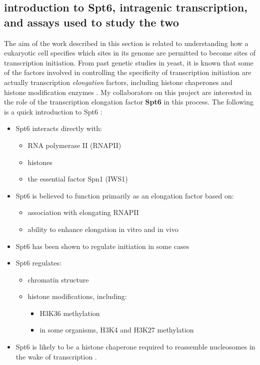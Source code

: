 \documentclass[9pt, letterpaper]{article}
\begin{document}
\subsection{introduction to Spt6, intragenic transcription, and assays used to study the two}

The aim of the work described in this section is related to understanding how a eukaryotic cell specifies which sites in its genome are permitted to become sites of transcription initiation. From past genetic studies in yeast, it is known that some of the factors involved in controlling the specificity of transcription initiation are actually transcription \textit{elongation} factors, including histone chaperones and histone modification enzymes \cite{kaplan2003, cheung2008, hennig2013}. My collaborators on this project are interested in the role of the transcription elongation factor \textbf{Spt6} in this process. The following is a quick introduction to Spt6 \cite{doris2018}:

\begin{itemize}[nosep, topsep=.5em]
\item Spt6 interacts directly with:
	\begin{itemize}[nosep]
	\item RNA polymerase II (RNAPII) \cite{close2011, diebold2011, liu2011, sdano2017, sun2010, yoh2007}
	\item histones \cite{bortvin1996, mccullough2015}
	\item the essential factor Spn1 (IWS1) \cite{diebold2010b, li2018, mcdonald2010}
	\end{itemize}
\item Spt6 is believed to function primarily as an elongation factor based on:
	\begin{itemize}[nosep]
	\item association with elongating RNAPII \cite{andrulis2000, ivanovska2011, kaplan2000, mayer2010}
	\item ability to enhance elongation in vitro \cite{endoh2004} and in vivo \cite{ardehali2009}
	\end{itemize}
\item Spt6 has been shown to regulate initiation in some cases \cite{adkins2006, ivanovska2011}
\item Spt6 regulates:
	\begin{itemize}[nosep]
	\item chromatin structure \cite{bortvin1996, degennaro2013, ivanovska2011, jeronimo2015, kaplan2003, perales2013, vanbakel2013}
	\item histone modifications, including:
		\begin{itemize}[nosep]
		\item H3K36 methylation \cite{carrozza2005, chu2006, yoh2008, youdell2008}
		\item in some organisms, H3K4 and H3K27 methylation \cite{begum2012, chen2012, degennaro2013, wang2017, wang2013}
		\end{itemize}
	\end{itemize}
\item Spt6 is likely to be a histone chaperone required to reassemble nucleosomes in the wake of transcription \cite{duina2011}.
\end{itemize}
\end{document}
